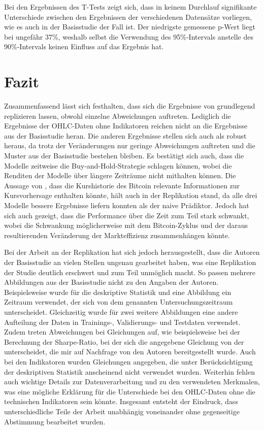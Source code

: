 \documentclass[a4paper, 12pt]{article}
\begin{document}
Bei den Ergebnissen des T-Tests zeigt sich, dass in keinem Durchlauf signifikante Unterschiede zwischen den Ergebnissen der verschiedenen Datensätze vorliegen, wie es auch in der Basisstudie der Fall ist.
Der niedrigste gemessene p-Wert liegt bei ungefähr 37\%, weshalb selbst die Verwendung des 95\%-Intervals anstelle des 90\%-Intervals keinen Einfluss auf das Ergebnis hat.

\section{Fazit}
Zusammenfassend lässt sich festhalten, dass sich die Ergebnisse von \textcite{Goutte2023} grundlegend replizieren lassen, obwohl einzelne Abweichungen auftreten.
Lediglich die Ergebnisse der OHLC-Daten ohne Indikatoren reichen nicht an die Ergebnisse aus der Basisstudie heran.
Die anderen Ergebnisse stellen sich auch als robust heraus, da trotz der Veränderungen nur geringe Abweichungen auftreten und die Muster aus der Basisstudie bestehen bleiben.
Es bestätigt sich auch, dass die Modelle zeitweise die Buy-and-Hold-Strategie schlagen können, wobei die Renditen der Modelle über längere Zeiträume nicht mithalten können.
Die Aussage von \citeauthor{Goutte2023}, dass die Kurshistorie des Bitcoin relevante Informationen zur Kursvorhersage enthalten könnte, hält auch in der Replikation stand, da alle drei Modelle bessere Ergebnisse liefern konnten als der naive Prädiktor.
Jedoch hat sich auch gezeigt, dass die Performance über die Zeit zum Teil stark schwankt, wobei die Schwankung möglicherweise mit dem Bitcoin-Zyklus und der daraus resultierenden Veränderung der Markteffizienz zusammenhängen könnte.
\vspace{\baselineskip}

Bei der Arbeit an der Replikation hat sich jedoch herausgestellt, dass die Autoren der Basisstudie an vielen Stellen ungenau gearbeitet haben, was eine Replikation der Studie deutlich erschwert und zum Teil unmöglich macht.
So passen mehrere Abbildungen aus der Basisstudie nicht zu den Angaben der Autoren.
Beispielsweise wurde für die deskriptive Statistik und eine Abbildung ein Zeitraum verwendet, der sich von dem genannten Untersuchungszeitraum unterscheidet.
Gleichzeitig wurde für zwei weitere Abbildungen eine andere Aufteilung der Daten in Trainings-, Validierungs- und Testdaten verwendet.
Zudem treten Abweichungen bei Gleichungen auf, wie beispielsweise bei der Berechnung der Sharpe-Ratio, bei der sich die angegebene Gleichung von der unterscheidet, die mir auf Nachfrage von den Autoren bereitgestellt wurde.
Auch bei den Indikatoren wurden Gleichungen angegeben, die unter Berücksichtigung der deskriptiven Statistik anscheinend nicht verwendet wurden.
Weiterhin fehlen auch wichtige Details zur Datenverarbeitung und zu den verwendeten Merkmalen, was eine mögliche Erklärung für die Unterschiede bei den OHLC-Daten ohne die technischen Indikatoren sein könnte.
Insgesamt entsteht der Eindruck, dass unterschiedliche Teile der Arbeit unabhängig voneinander ohne gegenseitige Abstimmung bearbeitet wurden.
\end{document}
